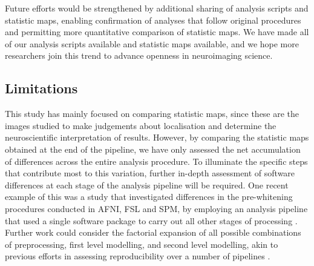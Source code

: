 Future efforts would be strengthened by additional sharing of analysis scripts and statistic maps, enabling confirmation of analyses that follow original procedures and permitting more quantitative comparison of statistic maps. We have made all of our analysis scripts available and statistic maps available, and we hope more researchers join this trend to advance openness in neuroimaging science. 

\subsection{Limitations}

This study has mainly focused on comparing statistic maps, since these are the images studied to make judgements about localisation and determine the neuroscientific interpretation of results. However, by comparing the statistic maps obtained at the end of the pipeline, we have only assessed the net accumulation of differences across the entire analysis procedure. To illuminate the specific steps that contribute most to this variation, further in-depth assessment of software differences at each stage of the analysis pipeline will be required. One recent example of this was a study that investigated differences in the pre-whitening procedures conducted in AFNI, FSL and SPM, by employing an analysis pipeline that used a single software package to carry out all other stages of processing \citep{Olszowy2019-cz}. Further work could consider the factorial expansion of all possible combinations of preprocessing, first level modelling, and second level modelling, akin to previous efforts in assessing reproducibility over a number of pipelines \citep{Strother2002-sz}.

